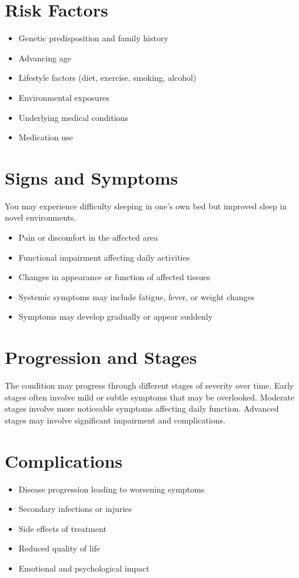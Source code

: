 \section{Risk Factors}
\begin{itemize}[noitemsep]
  \item Genetic predisposition and family history
  \item Advancing age
  \item Lifestyle factors (diet, exercise, smoking, alcohol)
  \item Environmental exposures
  \item Underlying medical conditions
  \item Medication use
\end{itemize}
\section{Signs and Symptoms}
You may experience difficulty sleeping in one's own bed but improved sleep in novel environments.

\begin{itemize}[noitemsep]
  \item Pain or discomfort in the affected area
  \item Functional impairment affecting daily activities
  \item Changes in appearance or function of affected tissues
  \item Systemic symptoms may include fatigue, fever, or weight changes
  \item Symptoms may develop gradually or appear suddenly
\end{itemize}
\section{Progression and Stages}
The condition may progress through different stages of severity over time. Early stages often involve mild or subtle symptoms that may be overlooked. Moderate stages involve more noticeable symptoms affecting daily function. Advanced stages may involve significant impairment and complications.
\section{Complications}
\begin{itemize}[noitemsep]
  \item Disease progression leading to worsening symptoms
  \item Secondary infections or injuries
  \item Side effects of treatment
  \item Reduced quality of life
  \item Emotional and psychological impact
\end{itemize}
